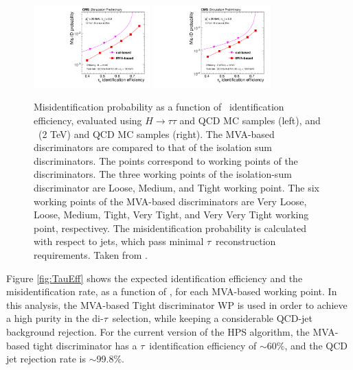 \begin{figure}[ht]
  \begin{center}
    \includegraphics[width=0.4\textwidth]{figuras/Chapter3/MVAIsoPerformanceHiggs}
    \includegraphics[width=0.4\textwidth]{figuras/Chapter3/MVAIsoPerformanceZprime}
    \caption{Misidentification probability as a function of \tauh~identification 
    efficiency, evaluated using $H \rightarrow \tau\tau$ and QCD MC samples (left), and \Zprime~(2 TeV) 
    and QCD MC samples (right). The MVA-based discriminators are compared to 
    that of the isolation sum discriminators. The points correspond to working points 
    of the discriminators. The three working points of the isolation-sum discriminator 
    are Loose, Medium, and Tight working point. The six working points of the MVA-based 
    discriminators are Very Loose, Loose, Medium, Tight, Very Tight, and Very Very
    Tight working point, respectivey. The misidentification probability is calculated with respect
    to jets, which pass minimal $\tau$~reconstruction requirements. Taken from \cite{CMS-PAS-TAU-16-002}.
    }
    \label{fig:IsoPerformance}
  \end{center}
\end{figure} 

\noindent Figure \ref{fig:TauEff} shows the expected identification 
efficiency and the misidentification rate, as a function of \pt, for each 
MVA-based working point. In this analysis, the MVA-based Tight 
discriminator WP is used in order to achieve a high purity in 
the di-$\tau$~selection, while keeping a considerable 
QCD-jet background rejection. For the current 
version of the HPS algorithm, the MVA-based tight discriminator 
has a $\tau$~identification efficiency of $\sim$60$\%$, and the 
QCD jet rejection rate is  $\sim$99.8$\%$. 

